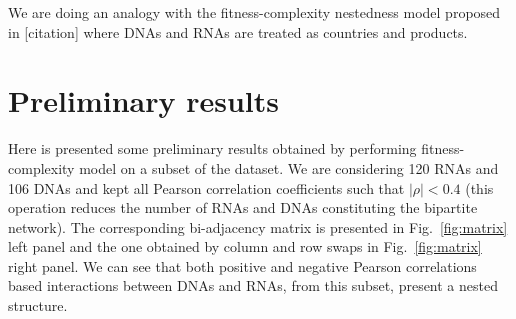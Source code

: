 \documentclass[10pt,a4paper]{article}
\begin{document}
We are doing an analogy with the fitness-complexity nestedness model proposed in [citation] where DNAs and RNAs are treated as countries and products.
\section{Preliminary results}
Here is presented some preliminary results obtained by performing fitness-complexity model on a subset of the dataset. We are considering 120 RNAs and 106 DNAs and kept all Pearson correlation coefficients  such that $|\rho| < 0.4$ (this operation reduces the number of RNAs and DNAs constituting the bipartite network). The corresponding bi-adjacency matrix is presented in Fig.~\ref{fig:matrix} left panel and the one obtained by column and row swaps in Fig.~\ref{fig:matrix} right panel. We can see that both positive and negative Pearson correlations based interactions between DNAs and RNAs, from this subset, present a nested structure.
\end{document}

